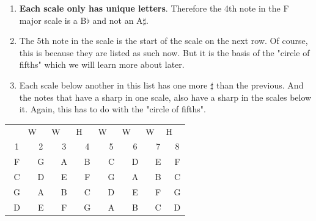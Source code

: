 \begin{enumerate}
	\item \textbf{Each scale only has unique letters}. Therefore the 4th note in the F major scale is a B$\flat$ and not an A$\sharp$.
	\item The 5th note in the scale is the start of the scale on the next row. Of course, this is because they are listed as such now. But it is the basis of the "circle of fifths" which we will learn more about later.
	\item Each scale below another in this list has one more $\sharp$ than the previous. And the notes that have a sharp in one scale, also have a sharp in the scales below it. Again, this has to do with the "circle of fifths".
\end{enumerate}

\begin{table}[h]
	\centering
	\begin{tabular}{*{16}{c}}
		& \multicolumn{2}{P{4mm}}{\large{W}} & \multicolumn{2}{P{4mm}}{\large{W}} & \multicolumn{2}{P{4mm}}{\large{H}} & \multicolumn{2}{P{4mm}}{\large{W}} & \multicolumn{2}{P{4mm}}{\large{W}} & \multicolumn{2}{P{4mm}}{\large{W}} & \multicolumn{2}{P{4mm}}{\large{H}} & \\
		\multicolumn{2}{P{4mm}}{1} & \multicolumn{2}{P{4mm}}{2} & \multicolumn{2}{P{4mm}}{3} & \multicolumn{2}{P{4mm}}{4} & \multicolumn{2}{P{4mm}}{5} & \multicolumn{2}{P{4mm}}{6} & \multicolumn{2}{P{4mm}}{7} & \multicolumn{2}{P{4mm}}{8} \\
		\multicolumn{2}{P{4mm}}{F} & \multicolumn{2}{P{4mm}}{G} & \multicolumn{2}{P{4mm}}{A} & \multicolumn{2}{P{4mm}}{B\flat} & \multicolumn{2}{P{4mm}}{C} & \multicolumn{2}{P{4mm}}{D} & \multicolumn{2}{P{4mm}}{E} & \multicolumn{2}{P{4mm}}{F} \\
		\multicolumn{2}{P{4mm}}{C} & \multicolumn{2}{P{4mm}}{D} & \multicolumn{2}{P{4mm}}{E} & \multicolumn{2}{P{4mm}}{F} & \multicolumn{2}{P{4mm}}{G} & \multicolumn{2}{P{4mm}}{A} & \multicolumn{2}{P{4mm}}{B} & \multicolumn{2}{P{4mm}}{C} \\
		\multicolumn{2}{P{4mm}}{G} & \multicolumn{2}{P{4mm}}{A} & \multicolumn{2}{P{4mm}}{B} & \multicolumn{2}{P{4mm}}{C} & \multicolumn{2}{P{4mm}}{D} & \multicolumn{2}{P{4mm}}{E} & \multicolumn{2}{P{4mm}}{F\sharp} & \multicolumn{2}{P{4mm}}{G} \\
		\multicolumn{2}{P{4mm}}{D} & \multicolumn{2}{P{4mm}}{E} & \multicolumn{2}{P{4mm}}{F\sharp} & \multicolumn{2}{P{4mm}}{G} & \multicolumn{2}{P{4mm}}{A} & \multicolumn{2}{P{4mm}}{B} & \multicolumn{2}{P{4mm}}{C\sharp} & \multicolumn{2}{P{4mm}}{D} \\

\end{tabular}
\end{table}
